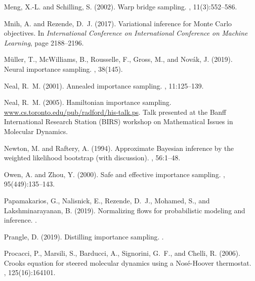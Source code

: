 \documentclass{article}
\newcommand{\1}{\mathds{1}}
\begin{document}
\begin{thebibliography}{50}
Meng, X.-L. and Schilling, S. (2002).
\newblock Warp bridge sampling.
,
  11(3):552--586.

Mnih, A. and Rezende, D.~J. (2017).
\newblock Variational inference for {M}onte {C}arlo objectives.
\newblock In {\em International Conference on International Conference on
  Machine Learning}, page 2188–2196.

M{\"u}ller, T., McWilliams, B., Rousselle, F., Gross, M., and Nov{\'a}k, J.
  (2019).
\newblock Neural importance sampling.
, 38(145).

Neal, R.~M. (2001).
\newblock Annealed importance sampling.
, 11:125--139.

Neal, R.~M. (2005).
\newblock Hamiltonian importance sampling.
\newblock \url{www.cs.toronto.edu/pub/radford/his-talk.ps}.
\newblock Talk presented at the Banff International Research Station (BIRS)
  workshop on Mathematical Issues in Molecular Dynamics.

Newton, M. and Raftery, A. (1994).
\newblock Approximate {B}ayesian inference by the weighted likelihood bootstrap
  (with discussion).
, 56:1--48.

Owen, A. and Zhou, Y. (2000).
\newblock Safe and effective importance sampling.
,
  95(449):135--143.

Papamakarios, G., Nalisnick, E., Rezende, D.~J., Mohamed, S., and
  Lakshminarayanan, B. (2019).
\newblock Normalizing flows for probabilistic modeling and inference.
.

Prangle, D. (2019).
\newblock Distilling importance sampling.
.

Procacci, P., Marsili, S., Barducci, A., Signorini, G.~F., and Chelli, R.
  (2006).
\newblock Crooks equation for steered molecular dynamics using a
  {N}os{\'e}-{H}oover thermostat.
, 125(16):164101.


\end{thebibliography}
\end{document}
